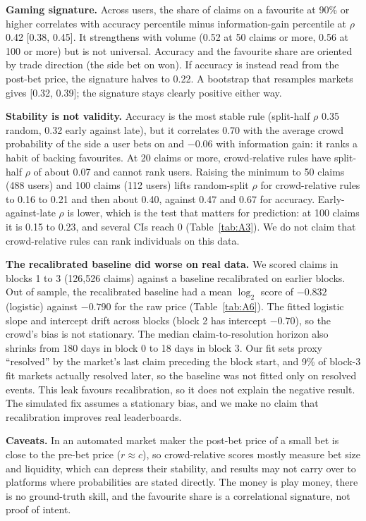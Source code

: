 \documentclass[10pt]{article}
\begin{document}
\textbf{Gaming signature.} Across users, the share of claims on a favourite at 90\% or higher correlates with accuracy percentile minus information-gain percentile at $\rho$ 0.42 [0.38, 0.45]. It strengthens with volume (0.52 at 50 claims or more, 0.56 at 100 or more) but is not universal. Accuracy and the favourite share are oriented by trade direction (the side bet on won). If accuracy is instead read from the post-bet price, the signature halves to 0.22. A bootstrap that resamples markets gives [0.32, 0.39]; the signature stays clearly positive either way.

\textbf{Stability is not validity.} Accuracy is the most stable rule (split-half $\rho$ 0.35 random, 0.32 early against late), but it correlates 0.70 with the average crowd probability of the side a user bets on and $-0.06$ with information gain: it ranks a habit of backing favourites. At 20 claims or more, crowd-relative rules have split-half $\rho$ of about 0.07 and cannot rank users. Raising the minimum to 50 claims (488 users) and 100 claims (112 users) lifts random-split $\rho$ for crowd-relative rules to 0.16 to 0.21 and then about 0.40, against 0.47 and 0.67 for accuracy. Early-against-late $\rho$ is lower, which is the test that matters for prediction: at 100 claims it is 0.15 to 0.23, and several CIs reach 0 (Table~\ref{tab:A3}). We do not claim that crowd-relative rules can rank individuals on this data.

\textbf{The recalibrated baseline did worse on real data.} We scored claims in blocks 1 to 3 (126,526 claims) against a baseline recalibrated on earlier blocks. Out of sample, the recalibrated baseline had a mean $\log_2$ score of $-0.832$ (logistic) against $-0.790$ for the raw price (Table~\ref{tab:A6}). The fitted logistic slope and intercept drift across blocks (block 2 has intercept $-0.70$), so the crowd's bias is not stationary. The median claim-to-resolution horizon also shrinks from 180 days in block 0 to 18 days in block 3. Our fit sets proxy ``resolved'' by the market's last claim preceding the block start, and 9\% of block-3 fit markets actually resolved later, so the baseline was not fitted only on resolved events. This leak favours recalibration, so it does not explain the negative result. The simulated fix assumes a stationary bias, and we make no claim that recalibration improves real leaderboards.

\textbf{Caveats.} In an automated market maker the post-bet price of a small bet is close to the pre-bet price ($r\approx c$), so crowd-relative scores mostly measure bet size and liquidity, which can depress their stability, and results may not carry over to platforms where probabilities are stated directly. The money is play money, there is no ground-truth skill, and the favourite share is a correlational signature, not proof of intent.
\end{document}
